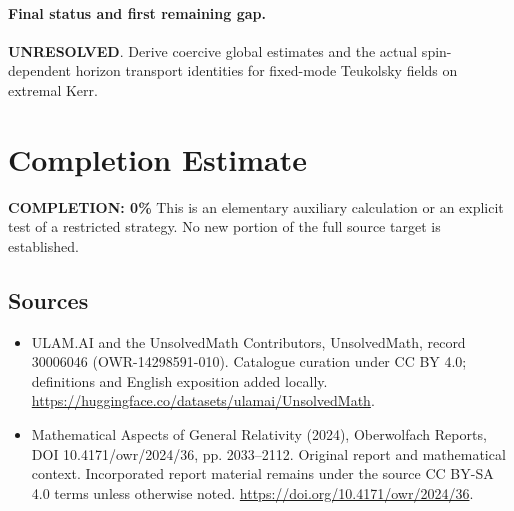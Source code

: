 \documentclass[11pt]{article}
\begin{document}
\paragraph{Final status and first remaining gap.}
\textbf{UNRESOLVED}. Derive coercive global estimates and the actual spin-dependent horizon transport identities for fixed-mode Teukolsky fields on extremal Kerr.

\section{Completion Estimate}
\noindent\textbf{COMPLETION: 0\%}
This is an elementary auxiliary calculation or an explicit test of a restricted strategy. No new portion of the full source target is established.

\subsection{Sources}
\begin{itemize}
\item[\hypertarget{source:30006046:1}{S1}] ULAM.AI and the UnsolvedMath Contributors, UnsolvedMath, record 30006046 (OWR-14298591-010). Catalogue curation under CC BY 4.0; definitions and English exposition added locally.
\url{https://huggingface.co/datasets/ulamai/UnsolvedMath}.
\item[\hypertarget{source:30006046:2}{S2}] Mathematical Aspects of General Relativity (2024), Oberwolfach Reports, DOI 10.4171/owr/2024/36, pp. 2033--2112. Original report and mathematical context. Incorporated report material remains under the source CC BY-SA 4.0 terms unless otherwise noted.
\url{https://doi.org/10.4171/owr/2024/36}.
\end{itemize}
\label{end:30006046}
\end{document}
